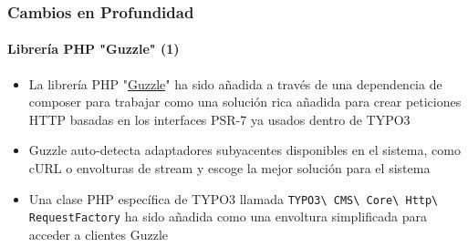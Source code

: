 \begin{frame}[fragile]
	\frametitle{Cambios en Profundidad}
	\framesubtitle{Librería PHP "Guzzle" (1)}

	\begin{itemize}

		\item La librería PHP
			"\href{http://docs.guzzlephp.org}{Guzzle}"
			ha sido añadida a través de una dependencia de composer para trabajar como una solución rica añadida
			para crear peticiones HTTP basadas en los interfaces PSR-7
			ya usados dentro de TYPO3

		\item Guzzle auto-detecta adaptadores subyacentes disponibles en
			el sistema, como cURL o envolturas de stream y escoge la mejor
			solución para el sistema

		\item Una clase PHP específica de TYPO3 llamada
			\texttt{TYPO3\textbackslash
				CMS\textbackslash
				Core\textbackslash
				Http\textbackslash
				RequestFactory}\newline
			ha sido añadida como una envoltura simplificada para acceder a  clientes Guzzle

	\end{itemize}

\end{frame}


